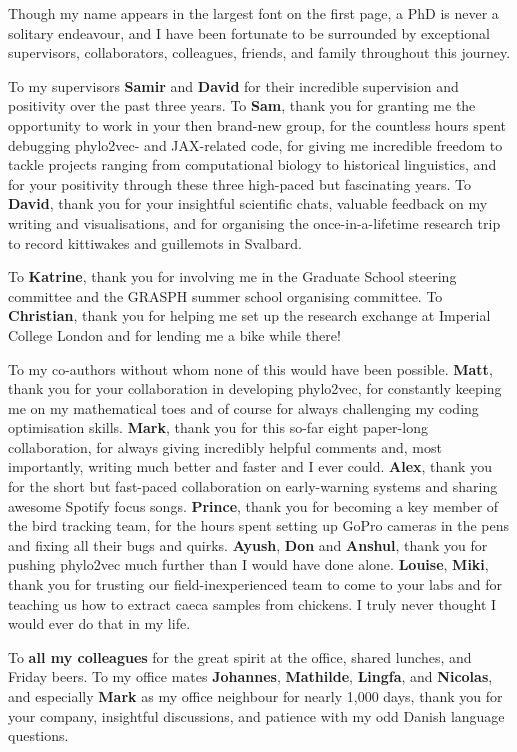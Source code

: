 Though my name appears in the largest font on the first page, a PhD is never a solitary endeavour, and I have been fortunate to be surrounded by exceptional supervisors, collaborators, colleagues, friends, and family throughout this journey.

To my supervisors \textbf{Samir} and \textbf{David} for their incredible supervision and positivity over the past three years. To \textbf{Sam}, thank you for granting me the opportunity to work in your then brand-new group, for the countless hours spent debugging phylo2vec- and JAX-related code, for giving me incredible freedom to tackle projects ranging from computational biology to historical linguistics, and for your positivity through these three high-paced but fascinating years. To \textbf{David}, thank you for your insightful scientific chats, valuable feedback on my writing and visualisations, and for organising the once-in-a-lifetime research trip to record kittiwakes and guillemots in Svalbard.

To \textbf{Katrine}, thank you for involving me in the Graduate School steering committee and the GRASPH summer school organising committee. To \textbf{Christian}, thank you for helping me set up the research exchange at Imperial College London and for lending me a bike while there!

To my co-authors without whom none of this would have been possible. \textbf{Matt}, thank you for your collaboration in developing phylo2vec, for constantly keeping me on my mathematical toes and of course for always challenging my coding optimisation skills. \textbf{Mark}, thank you for this so-far eight paper-long collaboration, for always giving incredibly helpful comments and, most importantly, writing much better and faster and I ever could. \textbf{Alex}, thank you for the short but fast-paced collaboration on early-warning systems and sharing awesome Spotify focus songs. \textbf{Prince}, thank you for becoming a key member of the bird tracking team, for the hours spent setting up GoPro cameras in the pens and fixing all their  bugs and quirks. \textbf{Ayush}, \textbf{Don} and \textbf{Anshul}, thank you for pushing phylo2vec much further than I would have done alone. \textbf{Louise}, \textbf{Miki}, thank you for trusting our field-inexperienced team to come to your labs and for teaching us how to extract caeca samples from chickens. I truly never thought I would ever do that in my life.

To\textbf{ all my colleagues} for the great spirit at the office, shared lunches, and Friday beers. To my office mates \textbf{Johannes}, \textbf{Mathilde}, \textbf{Lingfa}, and \textbf{Nicolas}, and especially \textbf{Mark} as my office neighbour for nearly 1,000 days, thank you for your company, insightful discussions, and patience with my odd Danish language questions.

